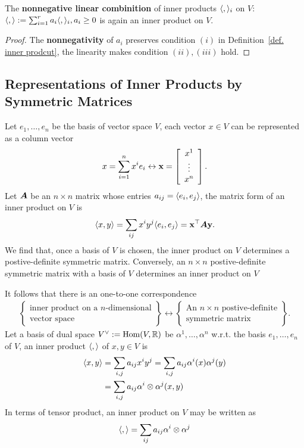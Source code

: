 \begin{proposition}
    The \textbf{nonnegative linear combinition} of inner products $\langle ,  \rangle_i$
     on $V$: $\langle ,  \rangle:=\sum_{i=1}^{r}a_i\langle ,  \rangle_i, a_i \geq 0$ is again an inner product on $V$.
\end{proposition}
\begin{proof}
    The \textbf{nonnegativity} of $a_i$ preserves condition $(i)$ 
    in Definition~\ref{def. inner prodcut}, the linearity makes condition $(ii),(iii)$ hold.
\end{proof}

\subsection{Representations of Inner Products by Symmetric Matrices}
Let $e_1,\dots, e_n$ be the basis of vector space $V$, 
each vector $x \in V$ can be represented as a column vector
\begin{equation}
    x=\sum_{i=1}^{n}x^i e_i \leftrightarrow {\mathbf{x}}=\left[\begin{array}{c}
        x^1 \\
        \vdots \\
        x^n
    \end{array}\right].
\end{equation}
Let ${\bm{A}}$ be an $n\times n$ matrix whose entries $a_{ij}=\langle e_i, e_j \rangle$, 
the matrix form of an inner product on $V$ is
\begin{equation}
    \langle x, y \rangle=\sum_{ij}x^i y^j \langle e_i, e_j \rangle = {\mathbf{x}}^\top {\bm{A}} {\mathbf{y}}.
\end{equation}
We find that, once a basis of $V$ is chosen, the inner product on $V$
determines a postive-definite symmetric matrix. Conversely, an $n \times n$
postive-definite symmetric matrix with a basis of $V$ determines an inner product 
on $V$

It follows that there is an one-to-one correspondence
\begin{align}
    \left\{
    \begin{array}{c}
        \text{inner product on a $n$-dimensional} \\
        \text{vector space}
    \end{array}
\right\}
\leftrightarrow
\left\{
    \begin{array}{c}
        \text{An $n \times n$ postive-definite} \\
        \text{symmetric matrix}
    \end{array}
\right\}.
\end{align}
Let a basis of dual space $V^\vee:=\mathrm{Hom}(V, {\mathbb{R}})$ be $\alpha^1,\dots,\alpha^n$ w.r.t.
the basis $e_1,\dots,e_n$ of $V$, an inner product $\langle ,  \rangle$ of $x,y\in V$ is
\begin{align}
    \langle x, y \rangle&=\sum_{i,j} a_{ij} x^i y^j=\sum_{i,j} a_{ij} \alpha^i(x) \alpha^j(y) \nonumber \\
    &=\sum_{i,j} a_{ij} \alpha^i \otimes \alpha^j (x,y) \nonumber
\end{align}
In terms of tensor product, an inner product on $V$ may be written as
\begin{align}
    \langle ,  \rangle = \sum_{ij}a_{ij} \alpha^i \otimes \alpha^j
\end{align}
